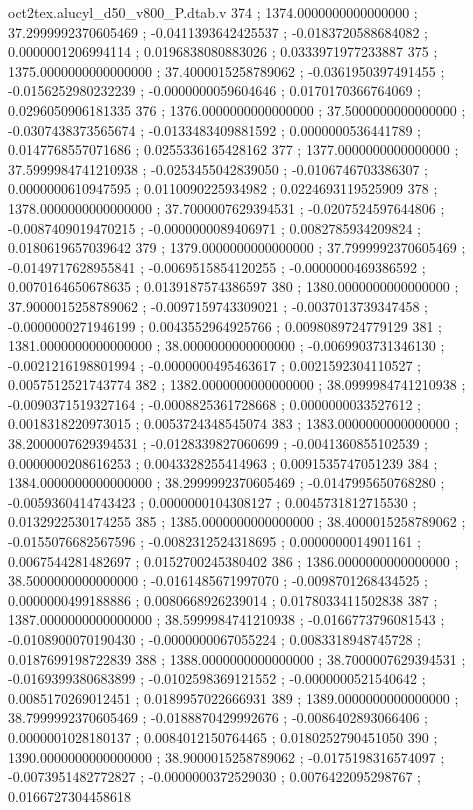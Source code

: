 \begin{filecontents}[overwrite]{oct2tex.alucyl_d50_v800_P.dtab.v}
374 ; 1374.0000000000000000 ; 37.2999992370605469 ; -0.0411393642425537 ; -0.0183720588684082 ; 0.0000001206994114 ; 0.0196838080883026 ; 0.0333971977233887
375 ; 1375.0000000000000000 ; 37.4000015258789062 ; -0.0361950397491455 ; -0.0156252980232239 ; -0.0000000059604646 ; 0.0170170366764069 ; 0.0296050906181335
376 ; 1376.0000000000000000 ; 37.5000000000000000 ; -0.0307438373565674 ; -0.0133483409881592 ; 0.0000000536441789 ; 0.0147768557071686 ; 0.0255336165428162
377 ; 1377.0000000000000000 ; 37.5999984741210938 ; -0.0253455042839050 ; -0.0106746703386307 ; 0.0000000610947595 ; 0.0110090225934982 ; 0.0224693119525909
378 ; 1378.0000000000000000 ; 37.7000007629394531 ; -0.0207524597644806 ; -0.0087409019470215 ; -0.0000000089406971 ; 0.0082785934209824 ; 0.0180619657039642
379 ; 1379.0000000000000000 ; 37.7999992370605469 ; -0.0149717628955841 ; -0.0069515854120255 ; -0.0000000469386592 ; 0.0070164650678635 ; 0.0139187574386597
380 ; 1380.0000000000000000 ; 37.9000015258789062 ; -0.0097159743309021 ; -0.0037013739347458 ; -0.0000000271946199 ; 0.0043552964925766 ; 0.0098089724779129
381 ; 1381.0000000000000000 ; 38.0000000000000000 ; -0.0069903731346130 ; -0.0021216198801994 ; -0.0000000495463617 ; 0.0021592304110527 ; 0.0057512521743774
382 ; 1382.0000000000000000 ; 38.0999984741210938 ; -0.0090371519327164 ; -0.0008825361728668 ; 0.0000000033527612 ; 0.0018318220973015 ; 0.0053724348545074
383 ; 1383.0000000000000000 ; 38.2000007629394531 ; -0.0128339827060699 ; -0.0041360855102539 ; 0.0000000208616253 ; 0.0043328255414963 ; 0.0091535747051239
384 ; 1384.0000000000000000 ; 38.2999992370605469 ; -0.0147995650768280 ; -0.0059360414743423 ; 0.0000000104308127 ; 0.0045731812715530 ; 0.0132922530174255
385 ; 1385.0000000000000000 ; 38.4000015258789062 ; -0.0155076682567596 ; -0.0082312524318695 ; 0.0000000014901161 ; 0.0067544281482697 ; 0.0152700245380402
386 ; 1386.0000000000000000 ; 38.5000000000000000 ; -0.0161485671997070 ; -0.0098701268434525 ; 0.0000000499188886 ; 0.0080668926239014 ; 0.0178033411502838
387 ; 1387.0000000000000000 ; 38.5999984741210938 ; -0.0166773796081543 ; -0.0108900070190430 ; -0.0000000067055224 ; 0.0083318948745728 ; 0.0187699198722839
388 ; 1388.0000000000000000 ; 38.7000007629394531 ; -0.0169399380683899 ; -0.0102598369121552 ; -0.0000000521540642 ; 0.0085170269012451 ; 0.0189957022666931
389 ; 1389.0000000000000000 ; 38.7999992370605469 ; -0.0188870429992676 ; -0.0086402893066406 ; 0.0000001028180137 ; 0.0084012150764465 ; 0.0180252790451050
390 ; 1390.0000000000000000 ; 38.9000015258789062 ; -0.0175198316574097 ; -0.0073951482772827 ; -0.0000000372529030 ; 0.0076422095298767 ; 0.0166727304458618

\end{filecontents}
